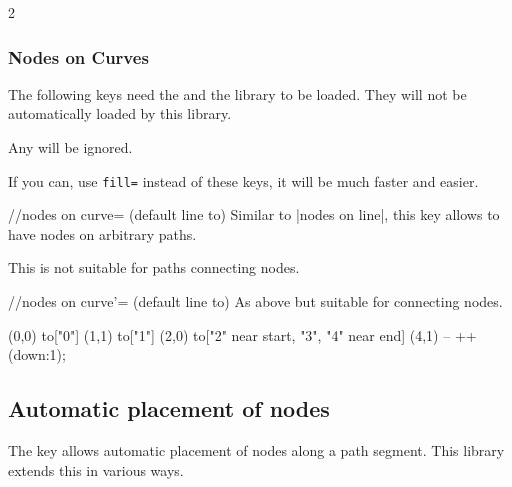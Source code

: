\begin{multicols*}{2}
\subsubsection{Nodes on Curves}
The following keys need the 
and the  \cite{spath3}
library to be loaded. They will not be automatically
loaded by this library.

Any  will be ignored.

If you can, use \texttt{fill=}
instead of these keys, it will be much faster and easier.

\begin{stylekey}{/\tikzext/nodes on curve= (default line to)}
Similar to |nodes on line|, this key allows
to have nodes on arbitrary paths.

This is not suitable for paths connecting nodes.
\end{stylekey}

\begin{stylekey}{/\tikzext/nodes on curve'= (default line to)}
As above but suitable for connecting nodes.
\end{stylekey}

\begin{codeexample}[preamble=\usetikzlibrary{ext.nodes, intersections, quotes, spath3}]
\end{codeexample}
\begin{codeexample}[preamble=\usetikzlibrary{ext.nodes, intersections, quotes, spath3}]
\tikz[inner sep=.15em, circle, nodes={draw, green}, sloped, ultra thick]
  \draw[->, ext/nodes on curve=bend left] (0,0) to["0"] (1,1)
                                                to["1"] (2,0)
                  to["2" near start, "3", "4" near end] (4,1)
                                                -- ++(down:1);
\end{codeexample}
\newcolumn

\subsection{Automatic placement of nodes}
The  key allows automatic placement of
nodes along a path segment.
This library extends this in various ways.


\end{multicols*}
